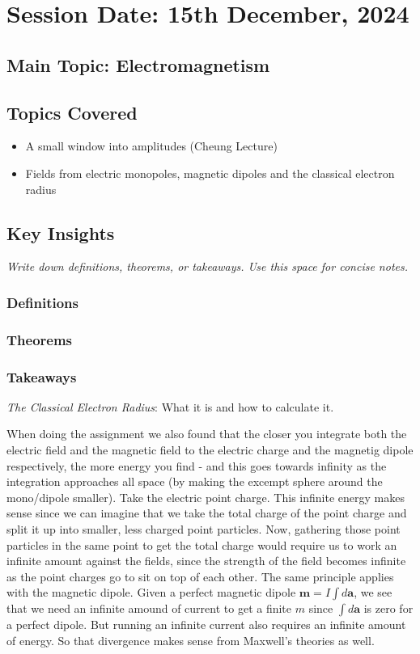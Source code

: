 \section{Session Date: 15th December, 2024}
\subsection*{Main Topic: Electromagnetism}
\subsection*{Topics Covered}
\begin{itemize}
    \item A small window into amplitudes (Cheung Lecture)
    \item Fields from electric monopoles, magnetic dipoles and the classical electron radius
\end{itemize}

\subsection*{Key Insights}
\textit{Write down definitions, theorems, or takeaways. Use this space for concise notes.}
\subsubsection*{Definitions} 
\subsubsection*{Theorems}
\subsubsection*{Takeaways}
\textit{The Classical Electron Radius}: What it is and how to calculate it. 

When doing the assignment we also found that the closer you integrate both the electric field and the magnetic field to the electric charge and the magnetig dipole respectively, the more energy you find - and this goes towards infinity as the integration approaches all space (by making the excempt sphere around the mono/dipole smaller). Take the electric point charge. This infinite energy makes sense since we can imagine that we take the total charge of the point charge and split it up into smaller, less charged point particles. Now, gathering those point particles in the same point to get the total charge would require us to work an infinite amount against the fields, since the strength of the field becomes infinite as the point charges go to sit on top of each other. The same principle applies with the magnetic dipole. Given a perfect magnetic dipole \(\mathbf{m} = I \int d \mathbf{a}\), we see that we need an infinite amound of current to get a finite \(m\) since \(\int d \mathbf{a}\) is zero for a perfect dipole. But running an infinite current also requires an infinite amount of energy. So that divergence makes sense from Maxwell's theories as well. 

